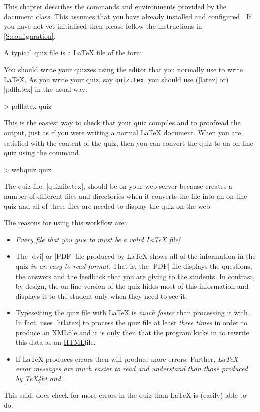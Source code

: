 \documentclass[svgnames]{article}
\newcommand\TeXfht{\href{https://www.ctan.org/tex4ht}{TeX4ht}\xspace}
\newcommand{\HTML}{\href{https://www.w3schools.com/html/html_intro.asp}{HTML}}
\newcommand\XML{\href{https://www.w3schools.com/xml/xml_whatis.asp}{XML}}
\begin{document}
    This chapter describes the commands and environments provided by the
    \WebQuiz document class. This assumes that you have already installed
    and configured \WebQuiz. If you have not yet initialised \WebQuiz
    then please follow the instructions in \autoref{S:configuration}.

    A typical \WebQuiz quiz file is a \LaTeX{} file of the form:


    \noindent You should write your quizzes using the editor that you
    normally use to write \LaTeX. As you write your quiz, say
    \texttt{quiz.tex}, you should use (\BashCode|latex| or)
    \BashCode|pdflatex| in the usual way:
    \begin{bashcode}
        > pdflatex quiz
    \end{bashcode}
    This is the easiest way to check that your quiz compiles and to
    proofread the output, just as if you were writing a normal \LaTeX{}
    document. When you are satisfied with the content of the quiz, then
    you can convert the quiz to an on-line quiz using the command
    \begin{bashcode}
       > webquiz quiz
    \end{bashcode}
    The quiz file, \BashCode|quizfile.tex|, should be on your web server
    because \WebQuiz creates a number of different files and directories
    when it converts the file into an on-line quiz and all of these files
    are needed to display the quiz on the web.

    The reasons for using this workflow are:
    \begin{itemize}
      \item \textit{Every file that you give to \WebQuiz must be a valid
      \LaTeX{} file!}

      \item The \BashCode|dvi| or \BashCode|PDF| file produced by \LaTeX{}
      shows all of the information in the quiz
      \textit{in an easy-to-read format}. That is, the \BashCode|PDF| file
      displays the questions, the answers and the feedback that you are
      giving to the students. In contrast, by design, the on-line version
      of the quiz hides most of this information and displays it to the
      student only when they need to see it.

      \item Typesetting the quiz file with \LaTeX{} is \textit{much
      faster} than processing it with \WebQuiz. In fact, \WebQuiz uses
      \BashCode|htlatex| to process the quiz file at least
      \textit{three times} in order to produce an \XML file and it is only
      then that the \WebQuiz program kicks in to rewrite this data as an
      \HTML file.

      \item If \LaTeX{} produces errors then \WebQuiz will produce more
      errors. Further, \textit{\LaTeX{} error messages are much easier to
      read and understand than those produced by \TeXfht and \WebQuiz}.
    \end{itemize}
    This said, \WebQuiz does check for more errors in the quiz than
    \LaTeX{} is (easily) able to do.
\end{document}
